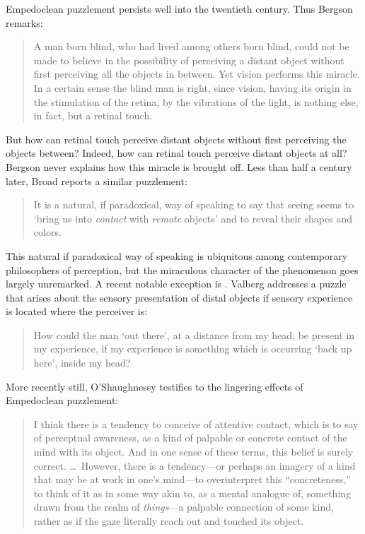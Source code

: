 Empedoclean puzzlement persists well into the twentieth century. Thus Bergson remarks:
\begin{quote}
	A man born blind, who had lived among others born blind, could not be made to believe in the possibility of perceiving a distant object without first perceiving all the objects in between. Yet vision performs this miracle. In a certain sense the blind man is right, since vision, having its origin in the stimulation of the retina, by the vibrations of the light, is nothing else, in fact, but a retinal touch. \citep[168]{Bergson:1907sh}
\end{quote}
But how can retinal touch perceive distant objects without first perceiving the objects between? Indeed, how can retinal touch perceive distant objects at all? Bergson never explains how this miracle is brought off. Less than half a century later, Broad reports a similar puzzlement:
\begin{quote}
    It is a natural, if paradoxical, way of speaking to say that seeing seems to `bring us into \emph{contact} with \emph{remote} objects' and to reveal their shapes and colors. \citep[33]{Broad:1952kx}
\end{quote}
This natural if paradoxical way of speaking is ubiquitous among contemporary philosophers of perception, but the miraculous character of the phenomenon goes largely unremarked. A recent notable exception is \citet{Valberg:1992aa}. Valberg addresses a puzzle that arises about the sensory presentation of distal objects if sensory experience is located where the perceiver is:
\begin{quote}
	How could the man `out there', at a distance from my head, be present in my experience, if my experience is something which is occurring `back up here', inside my head? \citep[141]{Valberg:1992aa}
\end{quote}
More recently still, O'Shaughnessy testifies to the lingering effects of Empedoclean puzzlement:
\begin{quote}
	I think there is a tendency to conceive of attentive contact, which is to say of perceptual awareness, as a kind of palpable or concrete contact of the mind with its object. And in one sense of these terms, this belief is surely correct. \ldots\ However, there is a tendency---or perhaps an imagery of a kind that may be at work in one's mind---to overinterpret this ``concreteness,'' to think of it as in some way akin to, as a mental analogue of, something drawn from the realm of \emph{things}---a palpable connection of some kind, rather as if the gaze literally reach out and touched its object. \citep[183]{OShaughnessy:2003eu}
\end{quote}


